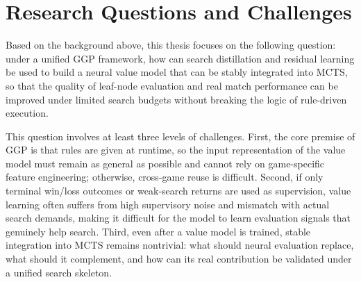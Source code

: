 
\section{Research Questions and Challenges}


Based on the background above, this thesis focuses on the following question: under a unified GGP framework, how can search distillation and residual learning be used to build a neural value model that can be stably integrated into MCTS, so that the quality of leaf-node evaluation and real match performance can be improved under limited search budgets without breaking the logic of rule-driven execution.


This question involves at least three levels of challenges. First, the core premise of GGP is that rules are given at runtime, so the input representation of the value model must remain as general as possible and cannot rely on game-specific feature engineering; otherwise, cross-game reuse is difficult. Second, if only terminal win/loss outcomes or weak-search returns are used as supervision, value learning often suffers from high supervisory noise and mismatch with actual search demands, making it difficult for the model to learn evaluation signals that genuinely help search. Third, even after a value model is trained, stable integration into MCTS remains nontrivial: what should neural evaluation replace, what should it complement, and how can its real contribution be validated under a unified search skeleton.


